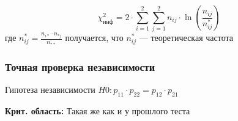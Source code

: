 \documentclass{article}
\begin{document}
    \begin{equation}
        \chi^{2}_{\text{инф}} = 2 \cdot \sum_{i=1}^{2} {\sum_{j=1}^{2} {n_{ij} \cdot \ln(\frac{n_{ij}}{n_{ij}^{*}}) } }
    \end{equation}
    где $n_{ij}^{*} = \frac{n_{i*} \cdot n_{*j}}{n_{**}}$ получается, что $n_{ij}^{*}$ --- теоретическая частота

    
    \subsubsection{Точная проверка независимости}

    Гипотеза независимости $H0: p_{11} \cdot p_{22} = p_{12} \cdot p_{21}$

    \textbf{Крит. область:} Такая же как и у прошлого теста
\end{document}
